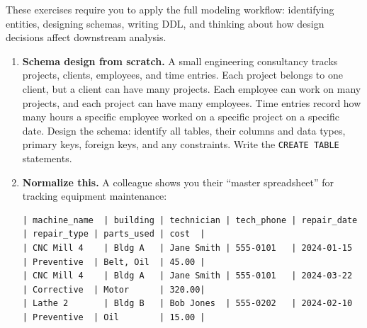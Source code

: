 \documentclass[
  letterpaper,
  DIV=11,
  numbers=noendperiod]{scrreprt}
\begin{document}
These exercises require you to apply the full modeling workflow:
identifying entities, designing schemas, writing DDL, and thinking about
how design decisions affect downstream analysis.

\begin{enumerate}
\def\labelenumi{\arabic{enumi}.}
\item
  \textbf{Schema design from scratch.} A small engineering consultancy
  tracks projects, clients, employees, and time entries. Each project
  belongs to one client, but a client can have many projects. Each
  employee can work on many projects, and each project can have many
  employees. Time entries record how many hours a specific employee
  worked on a specific project on a specific date. Design the schema:
  identify all tables, their columns and data types, primary keys,
  foreign keys, and any constraints. Write the \texttt{CREATE\ TABLE}
  statements.
\item
  \textbf{Normalize this.} A colleague shows you their ``master
  spreadsheet'' for tracking equipment maintenance:

\begin{verbatim}
| machine_name  | building | technician | tech_phone | repair_date | repair_type | parts_used | cost  |
| CNC Mill 4    | Bldg A   | Jane Smith | 555-0101   | 2024-01-15  | Preventive  | Belt, Oil  | 45.00 |
| CNC Mill 4    | Bldg A   | Jane Smith | 555-0101   | 2024-03-22  | Corrective  | Motor      | 320.00|
| Lathe 2       | Bldg B   | Bob Jones  | 555-0202   | 2024-02-10  | Preventive  | Oil        | 15.00 |
\end{verbatim}


\end{enumerate}
\end{document}

